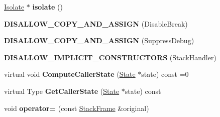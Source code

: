 \begin{DoxyCompactItemize}
\item 
\hyperlink{classv8_1_1internal_1_1_isolate}{Isolate} $\ast$ {\bfseries isolate} ()\hypertarget{classv8_1_1internal_1_1_b_a_s_e___e_m_b_e_d_d_e_d_a32ada69909c248ae5d86cb56b08a5cc9}{}\label{classv8_1_1internal_1_1_b_a_s_e___e_m_b_e_d_d_e_d_a32ada69909c248ae5d86cb56b08a5cc9}

\item 
{\bfseries D\+I\+S\+A\+L\+L\+O\+W\+\_\+\+C\+O\+P\+Y\+\_\+\+A\+N\+D\+\_\+\+A\+S\+S\+I\+GN} (Disable\+Break)\hypertarget{classv8_1_1internal_1_1_b_a_s_e___e_m_b_e_d_d_e_d_ad655242a0508297016aa99ab8dccfdea}{}\label{classv8_1_1internal_1_1_b_a_s_e___e_m_b_e_d_d_e_d_ad655242a0508297016aa99ab8dccfdea}

\item 
{\bfseries D\+I\+S\+A\+L\+L\+O\+W\+\_\+\+C\+O\+P\+Y\+\_\+\+A\+N\+D\+\_\+\+A\+S\+S\+I\+GN} (Suppress\+Debug)\hypertarget{classv8_1_1internal_1_1_b_a_s_e___e_m_b_e_d_d_e_d_ad9d37abde73935063ea803f332904127}{}\label{classv8_1_1internal_1_1_b_a_s_e___e_m_b_e_d_d_e_d_ad9d37abde73935063ea803f332904127}

\item 
{\bfseries D\+I\+S\+A\+L\+L\+O\+W\+\_\+\+I\+M\+P\+L\+I\+C\+I\+T\+\_\+\+C\+O\+N\+S\+T\+R\+U\+C\+T\+O\+RS} (Stack\+Handler)\hypertarget{classv8_1_1internal_1_1_b_a_s_e___e_m_b_e_d_d_e_d_a41051d48ae917e085fc4c16243901f77}{}\label{classv8_1_1internal_1_1_b_a_s_e___e_m_b_e_d_d_e_d_a41051d48ae917e085fc4c16243901f77}

\item 
virtual void {\bfseries Compute\+Caller\+State} (\hyperlink{structv8_1_1internal_1_1_b_a_s_e___e_m_b_e_d_d_e_d_1_1_state}{State} $\ast$state) const  =0\hypertarget{classv8_1_1internal_1_1_b_a_s_e___e_m_b_e_d_d_e_d_a4ba51abf430b95683ef91e5d19ca75af}{}\label{classv8_1_1internal_1_1_b_a_s_e___e_m_b_e_d_d_e_d_a4ba51abf430b95683ef91e5d19ca75af}

\item 
virtual Type {\bfseries Get\+Caller\+State} (\hyperlink{structv8_1_1internal_1_1_b_a_s_e___e_m_b_e_d_d_e_d_1_1_state}{State} $\ast$state) const \hypertarget{classv8_1_1internal_1_1_b_a_s_e___e_m_b_e_d_d_e_d_a0fc00dc54d4cc3c120248c5bdb149b52}{}\label{classv8_1_1internal_1_1_b_a_s_e___e_m_b_e_d_d_e_d_a0fc00dc54d4cc3c120248c5bdb149b52}

\item 
void {\bfseries operator=} (const \hyperlink{classv8_1_1_stack_frame}{Stack\+Frame} \&original)\hypertarget{classv8_1_1internal_1_1_b_a_s_e___e_m_b_e_d_d_e_d_aadf9ba0c9b2790824ac9bc9f0995191b}{}\label{classv8_1_1internal_1_1_b_a_s_e___e_m_b_e_d_d_e_d_aadf9ba0c9b2790824ac9bc9f0995191b}


\end{DoxyCompactItemize}
